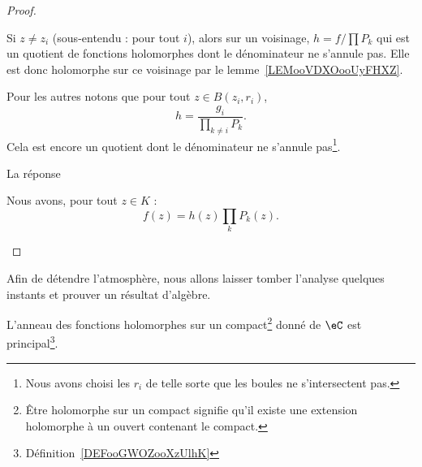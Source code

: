 \begin{proof}
\begin{subproof}
		Si \( z\neq z_i\) (sous-entendu : pour tout \( i\)), alors sur un voisinage, \( h=f/\prod P_k\) qui est un quotient de fonctions holomorphes dont le dénominateur ne s'annule pas. Elle est donc holomorphe sur ce voisinage par le lemme~\ref{LEMooVDXOooUyFHXZ}.

		Pour les autres notons que pour tout \( z\in B(z_i,r_i)\),
		\begin{equation}
			h=\frac{ g_i }{\prod_{k\neq i}P_k}.
		\end{equation}
		Cela est encore un quotient dont le dénominateur ne s'annule pas\footnote{Nous avons choisi les \( r_i\) de telle sorte que les boules ne s'intersectent pas.}.

		\item[La réponse]

		Nous avons, pour tout \( z\in K\) :
		\begin{equation}
			f(z)=h(z)\prod_{k}P_k(z).
		\end{equation}

	\end{subproof}
\end{proof}

Afin de détendre l'atmosphère, nous allons laisser tomber l'analyse quelques instants et prouver un résultat d'algèbre.
\begin{proposition}       \label{PROPooVWRPooGQMenV}
	L'anneau des fonctions holomorphes sur un compact\footnote{Être holomorphe sur un compact signifie qu'il existe une extension holomorphe à un ouvert contenant le compact.} donné de \( \eC\) est principal\footnote{Définition~\ref{DEFooGWOZooXzUlhK}}.
\end{proposition}

